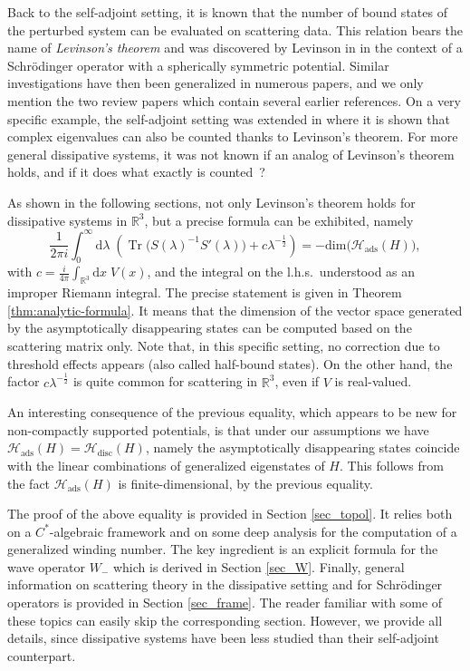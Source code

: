 \documentclass{article}
\def\d{\mathrm{d}}
\def\H{\mathcal H}
\def\R{\mathbb R}
\def\dim{\mathop{\mathrm{dim}}\nolimits}
\def\Tr{\mathop{\mathrm{Tr}}\nolimits}
\def\disc{{\mathrm{disc}}}
\def\dim{{\mathrm{dim}}}
\def\ads{{\mathrm{ads}}}
\begin{document}
Back to the self-adjoint setting, it is known that the number of bound states of the perturbed system
can be evaluated on scattering data. This relation bears the name of \emph{Levinson's theorem}
and was discovered by Levinson in \cite{Lev} in the context of
a Schr\"odinger operator with a spherically symmetric potential.
Similar investigations have then been generalized in numerous papers, and
we only mention the two review papers \cite{Ma,Ri} which contain several
earlier references. On a very specific example, the self-adjoint setting
was extended in \cite{NPR} where it is shown that complex eigenvalues can also
be counted thanks to Levinson's theorem. For more general dissipative systems, 
it was not known if an analog of Levinson's theorem holds, and if it does
what exactly is counted~?

As shown in the following sections, not only Levinson's theorem holds for dissipative systems in $\R^3$,
but a precise formula can be exhibited, namely
\begin{equation*}
\frac{1}{2\pi i} \int_0^\infty \d\lambda \;\! \left( \Tr\big(S(\lambda)^{-1}S'(\lambda)\big)+ c \lambda^{-\frac12} \right)   
= - \dim\big(\H_\ads(H)\big), 
\end{equation*}
with $c=\frac{i}{4 \pi} \int_{\R^3} \d x\;\! V(x)$, and the integral on the l.h.s.~understood as an improper Riemann integral. 
The precise statement is given in Theorem \ref{thm:analytic-formula}.
It means that the dimension of the 
vector space generated by the asymptotically disappearing states can be computed based on the scattering
matrix only. Note that, in this specific setting, no correction due to threshold effects appears (also called
half-bound states). On the other hand, the factor $c\lambda^{-\frac12}$ is quite common for scattering
in $\R^3$, even if $V$ is real-valued.

An interesting consequence of the previous equality, which appears to be new for non-compactly supported potentials, 
is that under our assumptions we have $\H_\ads(H)=\H_\disc(H)$, 
namely the asymptotically disappearing states coincide with the linear combinations of generalized eigenstates of $H$. 
This follows from the fact $\H_\ads(H)$ is finite-dimensional, by the previous equality. 

The proof of the above equality is provided in Section \ref{sec_topol}. It relies both on a $C^*$-algebraic
framework and on some deep analysis for the computation of a generalized winding number.
The key ingredient is an explicit formula for the wave operator $W_-$ which is derived in Section \ref{sec_W}.
Finally, general information on scattering theory in the dissipative setting and for Schr\"odinger operators
is provided in Section \ref{sec_frame}. The reader familiar with some of these topics can easily skip the corresponding section.
However, we provide all details, since dissipative systems have been less studied than their self-adjoint counterpart.
\end{document}

